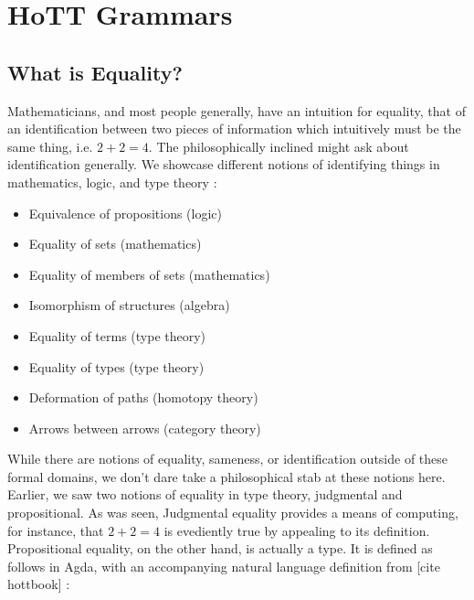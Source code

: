 \section{HoTT Grammars}

\subsection{What is Equality?}


Mathematicians, and most people generally, have an intuition
for equality, that of an identification between two pieces of information
which intuitively must be the same thing, i.e. $2+2=4$. The philosophically
inclined might ask about identification generally. We showcase different
notions of identifying things in mathematics, logic, and type theory :

\begin{itemize}
\item Equivalence of propositions (logic)
\item Equality of sets (mathematics)
\item Equality of members of sets (mathematics)
\item Isomorphism of structures (algebra)
\item Equality of terms (type theory)
\item Equality of types (type theory)
\item Deformation of paths (homotopy theory)
\item Arrows between arrows (category theory)
\end{itemize}

While there are notions of equality, sameness, or identification outside of
these formal domains, we don't dare take a philosophical stab at these notions
here. Earlier, we saw two notions of equality in type theory, judgmental and
propositional. As was seen, Judgmental equality provides a means of computing,
for instance, that $2+2=4$ is evediently true by appealing to its definition.
Propositional equality, on the other hand, is actually a type. It is defined as
follows in Agda, with an accompanying natural language definition from [cite
hottbook] :

